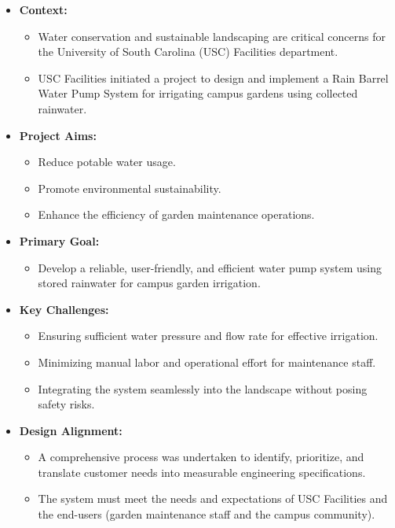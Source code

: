\documentclass[12pt]{report}
\begin{document}
\begin{itemize}
    \item \textbf{Context:}
    \begin{itemize}
        \item Water conservation and sustainable landscaping are critical concerns for the University of South Carolina (USC) Facilities department.
        \item USC Facilities initiated a project to design and implement a Rain Barrel Water Pump System for irrigating campus gardens using collected rainwater.
    \end{itemize}
    
    \item \textbf{Project Aims:}
    \begin{itemize}
        \item Reduce potable water usage.
        \item Promote environmental sustainability.
        \item Enhance the efficiency of garden maintenance operations.
    \end{itemize}
    
    \item \textbf{Primary Goal:}
    \begin{itemize}
        \item Develop a reliable, user-friendly, and efficient water pump system using stored rainwater for campus garden irrigation.
    \end{itemize}
    
    \item \textbf{Key Challenges:}
    \begin{itemize}
        \item Ensuring sufficient water pressure and flow rate for effective irrigation.
        \item Minimizing manual labor and operational effort for maintenance staff.
        \item Integrating the system seamlessly into the landscape without posing safety risks.
    \end{itemize}
    
    \item \textbf{Design Alignment:}
    \begin{itemize}
        \item A comprehensive process was undertaken to identify, prioritize, and translate customer needs into measurable engineering specifications.
        \item The system must meet the needs and expectations of USC Facilities and the end-users (garden maintenance staff and the campus community).
    \end{itemize}
    

\end{itemize}
\end{document}
